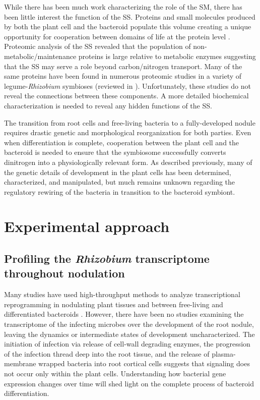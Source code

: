 While there has been much work characterizing the role of the SM, there has been
little interest the function of the SS. Proteins and small molecules produced by
both the plant cell and the bacteroid populate this volume creating a unique
opportunity for cooperation between domains of life at the protein level
\cite{Simonsen:1999hj}. Proteomic analysis of the SS revealed that the
population of non-metabolic/maintenance proteins is large relative to metabolic
enzymes suggesting that the SS may serve a role beyond carbon/nitrogen
transport. Many of the same proteins have been found in numerous proteomic studies in a
variety of legume-\textit{Rhizobium} symbioses (reviewed in \citet{Emerich:2014fo}).
Unfortunately, these studies do not reveal the connections between these
components. A more detailed biochemical characterization is needed to reveal any
hidden functions of the SS.

The transition from root cells and free-living bacteria to a fully-developed
nodule requires drastic genetic and morphological reorganization for both
parties. Even when differentiation is complete, cooperation between the plant
cell and the bacteroid is needed to ensure that the symbiosome successfully
converts dinitrogen into a physiologically relevant form. As described previously,
many of the genetic details of development in the plant cells has been
determined, characterized, and manipulated, but much remains unknown regarding
the regulatory rewiring of the bacteria in transition to the bacteroid symbiont.


\section*{Experimental approach} 
\subsection*{Profiling the \textit{Rhizobium} transcriptome throughout nodulation}
Many studies have used high-throughput methods to
analyze transcriptional reprogramming in nodulating plant tissues and between
free-living and differentiated bacteroids \cite{Cabeza:2014ht, Peng:2014dz,
Moreau:2011en, Breakspear:2015ek, Becker:2004ts}. However, there have been no
studies examining the transcriptome of the infecting microbes over the
development of the root nodule, leaving the dynamics or intermediate states of
development uncharacterized. The initiation of infection via release of
cell-wall degrading enzymes, the progression of the infection thread deep
into the root tissue, and the release of plasma-membrane wrapped bacteria into
root cortical cells suggests that signaling does not occur only within the plant
cells. Understanding how bacterial gene expression changes over
time will shed light on the complete process of bacteroid differentiation.


